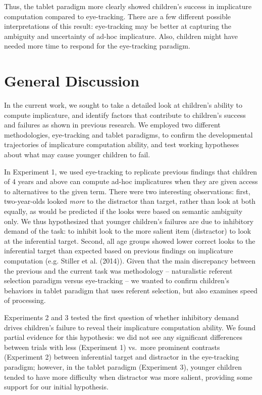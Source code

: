 \documentclass[a4paper,man,apacite,floatsintext]{apa6}
\begin{document}
Thus, the tablet paradigm more clearly showed children's success in
implicature computation compared to eye-tracking. There are a few
different possible interpretations of this result: eye-tracking may be
better at capturing the ambiguity and uncertainty of ad-hoc implicature.
Also, children might have needed more time to respond for the
eye-tracking paradigm.

\section{General Discussion}\label{general-discussion}

In the current work, we sought to take a detailed look at children's
ability to compute implicature, and identify factors that contribute to
children's success and failures as shown in previous research. We
employed two different methodologies, eye-tracking and tablet paradigms,
to confirm the developmental trajectories of implicature computation
ability, and test working hypotheses about what may cause younger
children to fail.

In Experiment 1, we used eye-tracking to replicate previous findings
that children of 4 years and above can compute ad-hoc implicatures when
they are given access to alternatives to the given term. There were two
interesting observations: first, two-year-olds looked \emph{more} to the
distractor than target, rather than look at both equally, as would be
predicted if the looks were based on semantic ambiguity only. We thus
hypothesized that younger children's failures are due to inhibitory
demand of the task: to inhibit look to the more salient item
(distractor) to look at the inferential target. Second, all age groups
showed lower correct looks to the inferential target than expected based
on previous findings on implicature computation (e.g. Stiller et al.
(2014)). Given that the main discrepancy between the previous and the
current task was methodology -- naturalistic referent selection paradigm
versus eye-tracking -- we wanted to confirm children's behaviors in
tablet paradigm that uses referent selection, but also examines speed of
processing.

Experiments 2 and 3 tested the first question of whether inhibitory
demand drives children's failure to reveal their implicature computation
ability. We found partial evidence for this hypothesis: we did not see
any significant differences between trials with less (Experiment 1)
vs.~more prominent contrasts (Experiment 2) between inferential target
and distractor in the eye-tracking paradigm; however, in the tablet
paradigm (Experiment 3), younger children tended to have more difficulty
when distractor was more salient, providing some support for our initial
hypothesis.
\end{document}

